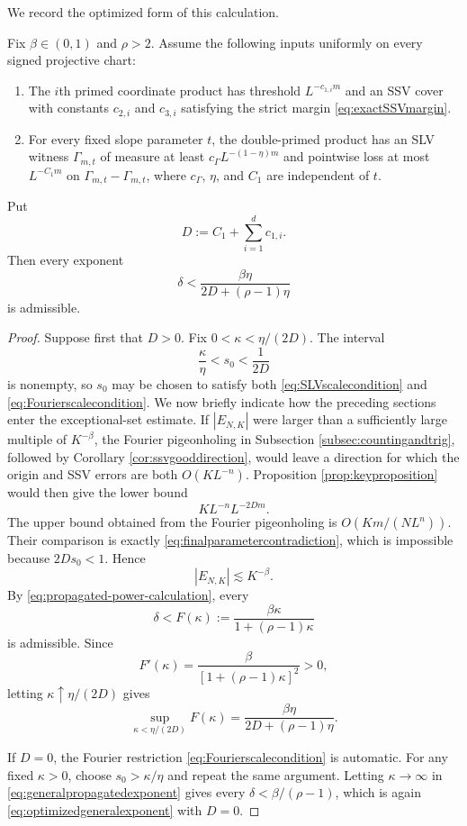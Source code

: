 \documentclass[12pt]{amsart}
\numberwithin{equation}{section}
\begin{document}
We record the optimized form of this calculation.

\begin{theorem}\label{thm:abstractexponentconversion}
Fix $\beta\in(0,1)$ and $\rho>2$.  Assume the following inputs uniformly on
every signed projective chart:
\begin{enumerate}[(1)]
\item The $i$th primed coordinate product has threshold $L^{-c_{1,i}m}$ and
an SSV cover with constants $c_{2,i}$ and $c_{3,i}$ satisfying the strict
margin \eqref{eq:exactSSVmargin}.
\medskip
\item For every fixed slope parameter $t$, the double-primed product has an
SLV witness $\Gamma_{m,t}$ of measure at least
$c_\Gamma L^{-(1-\eta)m}$ and pointwise loss at most $L^{-C_1m}$ on
$\Gamma_{m,t}-\Gamma_{m,t}$, where $c_\Gamma$, $\eta$, and $C_1$ are
independent of $t$.
\end{enumerate}
Put
\[
 D:=C_1+\sum_{i=1}^d c_{1,i}.
\]
Then every exponent
\begin{equation}\label{eq:optimizedgeneralexponent}
 \delta<
 \frac{\beta\eta}{2D+(\rho-1)\eta}
\end{equation}
is admissible.
\end{theorem}

\begin{proof}
Suppose first that $D>0$.  Fix
$0<\kappa<\eta/(2D)$.  The interval
\[
 \frac\kappa\eta<s_0<\frac1{2D}
\]
is nonempty, so $s_0$ may be chosen to satisfy both
\eqref{eq:SLVscalecondition} and \eqref{eq:Fourierscalecondition}.  We now
briefly indicate how the preceding sections enter the exceptional-set
estimate.  If $|E_{N,K}|$ were larger than a sufficiently large multiple of
$K^{-\beta}$, the Fourier pigeonholing in Subsection
\ref{subsec:countingandtrig}, followed by Corollary
\ref{cor:ssvgooddirection}, would leave a direction for which the origin and
SSV errors are both $O(KL^{-n})$.  Proposition
\ref{prop:keyproposition} would then give the lower bound
\[
 KL^{-n}L^{-2Dm}.
\]
The upper bound obtained from the Fourier pigeonholing is $O(Km/(NL^n))$.
Their comparison is exactly \eqref{eq:finalparametercontradiction}, which is
impossible because $2Ds_0<1$.  Hence
\[
 |E_{N,K}|\lesssim K^{-\beta}.
\]
By \eqref{eq:propagated-power-calculation}, every
\[
 \delta<F(\kappa)
 :=\frac{\beta\kappa}{1+(\rho-1)\kappa}
\]
is admissible.  Since
\[
 F'(\kappa)
 =\frac{\beta}{[1+(\rho-1)\kappa]^2}>0,
\]
letting $\kappa\uparrow\eta/(2D)$ gives
\[
 \sup_{\kappa<\eta/(2D)}F(\kappa)
 =\frac{\beta\eta}{2D+(\rho-1)\eta}.
\]

If $D=0$, the Fourier restriction \eqref{eq:Fourierscalecondition} is
automatic.  For any fixed $\kappa>0$, choose $s_0>\kappa/\eta$ and repeat the
same argument.  Letting $\kappa\to\infty$ in
\eqref{eq:generalpropagatedexponent} gives every
$\delta<\beta/(\rho-1)$, which is again
\eqref{eq:optimizedgeneralexponent} with $D=0$.
\end{proof}
\end{document}
